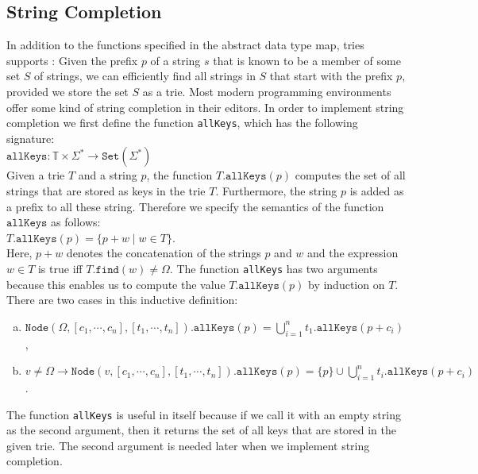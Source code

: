 \subsection{String Completion}
In addition to the functions specified in the abstract data type map, tries supports 
:  Given the prefix $p$ of a string $s$ that is known to be a
member of some set $S$ of strings, we can efficiently find all strings in $S$ that start with the prefix $p$, provided we
store the set $S$ as a trie.  Most modern programming environments offer some kind of string completion in
their editors.  In order to implement string completion we first define the function \texttt{allKeys}, which
has the following signature:
\\[0.2cm]
\hspace*{1.3cm}
$\texttt{allKeys}: \mathbb{T} \times \Sigma^* \rightarrow \texttt{Set}(\Sigma^*)$
\\[0.2cm]
Given a trie $T$ and a string $p$, the function $T.\texttt{allKeys}(p)$ computes the set of all strings that
are stored as keys in the trie $T$.  Furthermore, the string $p$ is added as a prefix to all these string.
Therefore we specify the semantics of the function $\texttt{allKeys}$ as follows:
\\[0.2cm]
\hspace*{1.3cm}
$T.\texttt{allKeys}(p) = \{ p+w \mid w \in T \}$.
\\[0.2cm]
Here, $p+w$ denotes the concatenation of the strings $p$ and $w$ and the expression $w \in T$ is true iff
$T.\texttt{find}(w) \not= \Omega$.  The function \texttt{allKeys} has two arguments because this enables us to
compute the value $T.\texttt{allKeys}(p)$ by induction on $T$.  There are two cases in this inductive definition: 
\begin{enumerate}[(a)]
\item $\texttt{Node}(\Omega, [c_1, \cdots, c_n], [t_1,\cdots,t_n]).\texttt{allKeys}(p) = 
       \bigcup\limits_{i=1}^n t_1.\texttt{allKeys}(p+c_i) 
      $,
\item $v \not= \Omega \rightarrow 
       \texttt{Node}(v, [c_1, \cdots, c_n], [t_1,\cdots,t_n]).\texttt{allKeys}(p) = 
       \{p\} \cup \bigcup\limits_{i=1}^n t_i.\texttt{allKeys}(p+c_i) 
      $.
\end{enumerate}
The function \texttt{allKeys} is useful in itself because if we call it with an empty string as the second
argument, then it returns the set of all keys that are stored in the given trie.  The second argument is needed
later when we implement string completion. 

